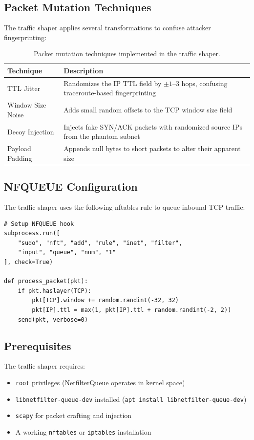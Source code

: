 \documentclass[12pt,a4paper]{article}
\begin{document}
\subsection{Packet Mutation Techniques}

The traffic shaper applies several transformations to confuse attacker fingerprinting:

\begin{table}[H]
\centering
\caption{Packet mutation techniques implemented in the traffic shaper.}
\label{tab:mutations}
\begin{tabularx}{\textwidth}{lX}
\toprule
\textbf{Technique} & \textbf{Description} \\
\midrule
TTL Jitter & Randomizes the IP TTL field by $\pm 1$--$3$ hops, confusing traceroute-based fingerprinting \\
Window Size Noise & Adds small random offsets to the TCP window size field \\
Decoy Injection & Injects fake SYN/ACK packets with randomized source IPs from the phantom subnet \\
Payload Padding & Appends null bytes to short packets to alter their apparent size \\
\bottomrule
\end{tabularx}
\end{table}

\subsection{NFQUEUE Configuration}

The traffic shaper uses the following nftables rule to queue inbound TCP traffic:

\begin{lstlisting}[style=python, caption={NFQUEUE rule creation}]
# Setup NFQUEUE hook
subprocess.run([
    "sudo", "nft", "add", "rule", "inet", "filter",
    "input", "queue", "num", "1"
], check=True)

def process_packet(pkt):
    if pkt.haslayer(TCP):
        pkt[TCP].window += random.randint(-32, 32)
        pkt[IP].ttl = max(1, pkt[IP].ttl + random.randint(-2, 2))
    send(pkt, verbose=0)
\end{lstlisting}

\subsection{Prerequisites}

The traffic shaper requires:
\begin{itemize}[leftmargin=*, itemsep=3pt]
    \item \texttt{root} privileges (NetfilterQueue operates in kernel space)
    \item \texttt{libnetfilter-queue-dev} installed (\texttt{apt install libnetfilter-queue-dev})
    \item \texttt{scapy} for packet crafting and injection
    \item A working \texttt{nftables} or \texttt{iptables} installation
\end{itemize}
\end{document}
